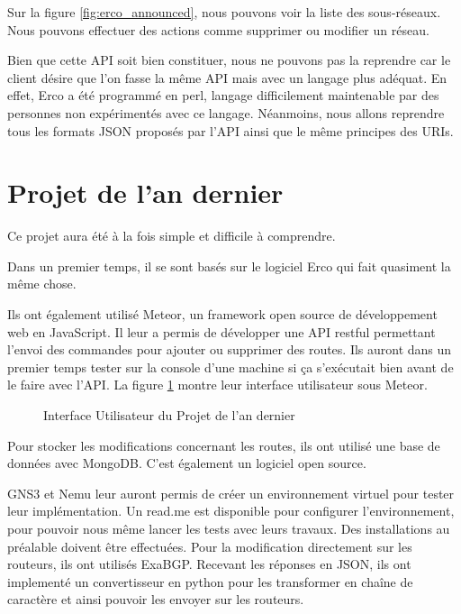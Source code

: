 Sur la figure \ref{fig:erco_announced}, nous pouvons voir la liste des sous-réseaux. Nous pouvons effectuer des actions comme supprimer ou modifier un réseau.

Bien que cette API soit bien constituer, nous ne pouvons pas la reprendre car le client désire que l'on fasse la même API mais avec un langage plus adéquat. En effet, Erco a été programmé en perl, langage difficilement maintenable par des personnes non expérimentés avec ce langage. Néanmoins, nous allons reprendre tous les formats JSON proposés par l'API ainsi que le même principes des URIs.

\section{Projet de l'an dernier}
Ce projet aura été à la fois simple et difficile à comprendre.

Dans un premier temps, il se sont basés sur le logiciel Erco qui fait quasiment la même chose.

Ils ont également utilisé Meteor, un framework open source de développement web en JavaScript.
Il leur a permis de développer une API restful permettant l'envoi des commandes pour ajouter ou supprimer des routes. Ils auront dans un premier temps tester sur la console d'une machine si ça s'exécutait bien avant de le faire avec l'API. La figure \ref{fig:meteor_route} montre leur interface utilisateur sous Meteor.

\begin{figure}[H]
\caption{Interface Utilisateur du Projet de l'an dernier}
\label{fig:meteor_route}
\end{figure}

Pour stocker les modifications concernant les routes, ils ont utilisé une base de données avec MongoDB. C'est également un logiciel open source. 

GNS3 et Nemu leur auront permis de créer un environnement virtuel pour tester leur implémentation. Un read.me est disponible pour configurer l'environnement, pour pouvoir nous même lancer les tests avec leurs travaux. Des installations au préalable doivent être effectuées.
Pour la modification directement sur les routeurs, ils ont utilisés ExaBGP. Recevant les réponses en JSON, ils ont implementé un convertisseur en python pour les transformer en chaîne de caractère et ainsi pouvoir les envoyer sur les routeurs.


